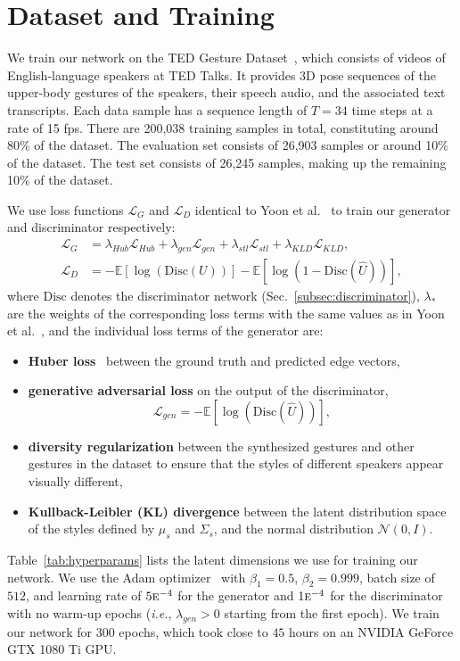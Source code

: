 \documentclass[conference,compsoc]{IEEEtran}
\theoremstyle{definition}
\newcommand{\parens}[1]{\left(#1\right)}
\newcommand{\bracks}[1]{\left[#1\right]}
\begin{document}
\section{Dataset and Training}
We train our network on the TED Gesture Dataset~\cite{cospeech_gestures}, which consists of videos of English-language speakers at TED Talks. It provides 3D pose sequences of the upper-body gestures of the speakers, their speech audio, and the associated text transcripts. Each data sample has a sequence length of $T=34$ time steps at a rate of 15 fps. There are 200,038 training samples in total, constituting around 80\% of the dataset. The evaluation set consists of 26,903 samples or around 10\% of the dataset. The test set consists of 26,245 samples, making up the remaining 10\% of the dataset.

We use loss functions $\mathcal{L}_G$ and $\mathcal{L}_D$ identical to Yoon et al.~\cite{trimodal} to train our generator and discriminator respectively:
\begin{align}
    \mathcal{L}_G &= \lambda_{Hub}\mathcal{L}_{Hub} + \lambda_{gen}\mathcal{L}_{gen} + \lambda_{stl}\mathcal{L}_{stl} + \lambda_{KLD}\mathcal{L}_{KLD}, \\
    \mathcal{L}_D &= -\mathbb{E}\bracks{\log\parens{\textrm{Disc}\parens{U}}} - \mathbb{E}\bracks{\log\parens{1 - \textrm{Disc}\parens{\hat{U}}}},
\end{align}
where $\textrm{Disc}$ denotes the discriminator network (Sec.~\ref{subsec:discriminator}), $\lambda_*$ are the weights of the corresponding loss terms with the same values as in Yoon et al.~\cite{trimodal}, and the individual loss terms of the generator are:
\begin{itemize}
    \item \textbf{Huber loss}~\cite{huber_loss} between the ground truth and predicted edge vectors,
    \item \textbf{generative adversarial loss} on the output of the discriminator,
    \begin{equation}
        \mathcal{L}_{gen} = -\mathbb{E}\bracks{\log\parens{\textrm{Disc}\parens{\hat{U}}}},
    \end{equation}
    \item \textbf{diversity regularization} between the synthesized gestures and other gestures in the dataset to ensure that the styles of different speakers appear visually different,
    \item \textbf{Kullback-Leibler (KL) divergence} between the latent distribution space of the styles defined by $\mu_s$ and $\Sigma_s$, and the normal distribution $\mathcal{N}\parens{0, I}$.
\end{itemize}
Table~\ref{tab:hyperparams} lists the latent dimensions we use for training our network. We use the Adam optimizer~\cite{adam} with $\beta_1 = 0.5$, $\beta_2 = 0.999$, batch size of $512$, and learning rate of $5\textsc{e}^{-4}$ for the generator and $1\textsc{e}^{-4}$ for the discriminator with no warm-up epochs (\textit{i.e.}, $\lambda_{gen} > 0$ starting from the first epoch). We train our network for $300$ epochs, which took close to $45$ hours on an NVIDIA GeForce GTX 1080 Ti GPU.
\end{document}

